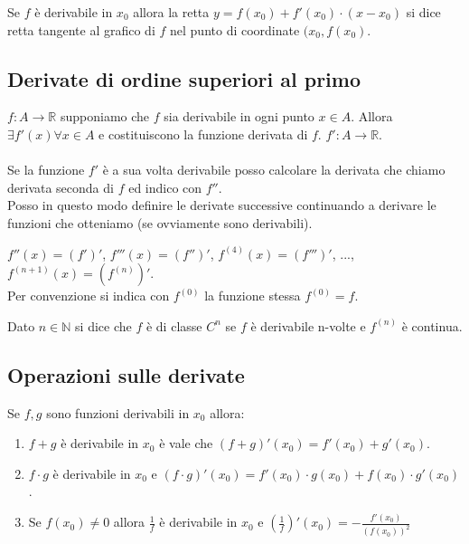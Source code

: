 \begin{definition}
    Se $f$ è derivabile in $x_0$ allora la retta $y = f(x_0) + f'(x_0) \cdot (x - x_0)$ si dice retta tangente al grafico di $f$ nel punto di coordinate $(x_0, f(x_0)$.
\end{definition}

\newpage
\subsection{Derivate di ordine superiori al primo}
$f: A \to \mathbb{R}$ supponiamo che $f$ sia derivabile in ogni punto $x \in A$. Allora $\exists f'(x) \forall x \in A$ e costituiscono la funzione derivata di $f$. $f': A \to \mathbb{R}$.\\\\
Se la funzione $f'$ è a sua volta derivabile posso calcolare la derivata che chiamo derivata seconda di $f$ ed indico con $f''$.\\
Posso in questo modo definire le derivate successive continuando a derivare le funzioni che otteniamo (se ovviamente sono derivabili).
\begin{example}
$f''(x) = (f')'$, $f'''(x) = (f'')'$, $f^(4)(x) = (f''')'$, ..., $f^{(n+1)}(x) = (f^{(n)})'$.\\
Per convenzione si indica con $f^{(0)}$ la funzione stessa $f^{(0)} = f$.
\end{example}

\begin{definition}
    Dato $n \in \mathbb{N}$ si dice che $f$ è di classe $C^n$ se $f$ è derivabile n-volte e $f^{(n)}$ è continua.
\end{definition}


\subsection{Operazioni sulle derivate}
\begin{theorem}
    Se $f,g$ sono funzioni derivabili in $x_0$ allora:
    \begin{enumerate}
        \item $f + g$ è derivabile in $x_0$ è vale che $(f + g)'(x_0) = f'(x_0) + g'(x_0)$.
        \item $f \cdot g$ è derivabile in $x_0$ e $(f \cdot g)'(x_0) = f'(x_0) \cdot g(x_0) + f(x_0) \cdot g'(x_0)$.
        \item Se $f(x_0) \neq 0$ allora $\frac{1}{f}$ è derivabile in $x_0$ e $(\frac{1}{f})'(x_0) = - \frac{f'(x_0)}{(f(x_0))^2}$ 
    \end{enumerate}
\end{theorem}

